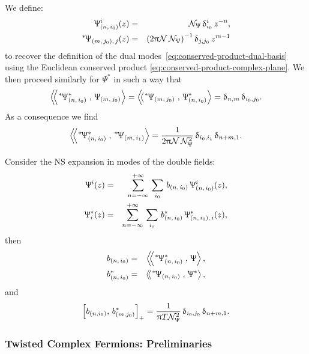 We define:
\begin{eqnarray}
  \Psi^i_{( n,\, i_0 )}( z )
  & = &
  \cN_{\Psi}\, \delta^i_{i_0}\, z^{-n},
  \\
  \dual{\Psi}_{( m,\, j_0 ),\, j}( z )
  & = &
  \qty( 2 \pi \cN\, \cN_{\Psi} )^{-1}\, \delta_{j, j_0}\, z^{m-1}
\end{eqnarray}
to recover the definition of the dual modes~\eqref{eq:conserved-product-dual-basis} using the Euclidean conserved product \eqref{eq:conserved-product-complex-plane}.
We then proceed similarly for $\Psi^*$ in such a way that
\begin{equation}
  \lconsprod{\dual{\Psi}_{( n,\, i_0 )}^*}{\Psi_{( m,\, j_0 )}}
  =
  \lconsprod{\dual{\Psi}_{( m,\, j_0 )}}{\Psi^*_{( n,\, i_0 )}}
  =
  \delta_{n, m}\, \delta_{i_0, j_0}.
\end{equation}
As a consequence we find
\begin{equation}
  \lconsprod{\dual{\Psi}_{( n,\, i_0 )}^*}{\dual{\Psi}_{( m,\, i_1 )}}
  =
  \frac{1}{2 \pi \cN\, \cN^2_{\Psi}}\, \delta_{i_0, i_1}\, \delta_{n + m, 1}.
\end{equation}

Consider the  NS expansion in modes of the double fields:
\begin{eqnarray}
  \Uppsi^i( z )
  & = &
  \sum\limits_{n = -\infty}^{+\infty}\,
  \sum\limits_{i_0}\,
  b_{(n,\, i_0)}\, \Uppsi^i_{( n,\, i_0 )}( z ),
  \\
  \Uppsi^{*}_i( z )
  & = &
  \sum\limits_{n = -\infty}^{+\infty}\,
  \sum\limits_{i_0}\,
  b^*_{(n,\, i_0)}\, \Uppsi^{*}_{( n,\, i_0 ),\, i}( z ),
\end{eqnarray}
then
\begin{eqnarray}
  b_{( n,\, i_0 )}
  & = &
  \lconsprod{\dual{\Psi}_{( n,\, i_0 )}^*}{\Psi},
  \\
  b^*_{( n,\, i_0 )}
  & = &
  \lconsprod{\dual{\Psi}_{( n,\, i_0)}}{\Psi^*},
\end{eqnarray}
and
\begin{equation}
  \left[ b_{( n, i_0 )},\, b^*_{( m, j_0 )} \right]_+
  =
  \frac{1}{\uppi T \mathcal{N}_{\Uppsi}^2}\, \updelta_{i_0, j_0}\, \updelta_{n + m, 1}.
  \label{eq:ns-algebra}
\end{equation}


\subsubsection{Twisted Complex Fermions: Preliminaries}

